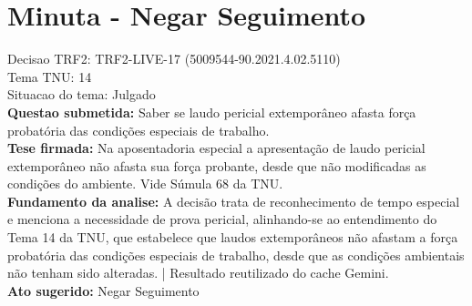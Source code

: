 \documentclass{article}
\begin{document}
\section*{Minuta - Negar Seguimento}
Decisao TRF2: TRF2-LIVE-17 (5009544-90.2021.4.02.5110)\\
Tema TNU: 14\\
Situacao do tema: Julgado\\
\textbf{Questao submetida:} Saber se laudo pericial extemporâneo afasta força probatória das condições especiais de trabalho.\\
\textbf{Tese firmada:} Na aposentadoria especial a apresentação de laudo pericial extemporâneo não afasta sua força probante, desde que não modificadas as condições do ambiente. Vide Súmula 68 da TNU.\\
\textbf{Fundamento da analise:} A decisão trata de reconhecimento de tempo especial e menciona a necessidade de prova pericial, alinhando-se ao entendimento do Tema 14 da TNU, que estabelece que laudos extemporâneos não afastam a força probatória das condições especiais de trabalho, desde que as condições ambientais não tenham sido alteradas. | Resultado reutilizado do cache Gemini.\\
\textbf{Ato sugerido:} Negar Seguimento
\end{document}

